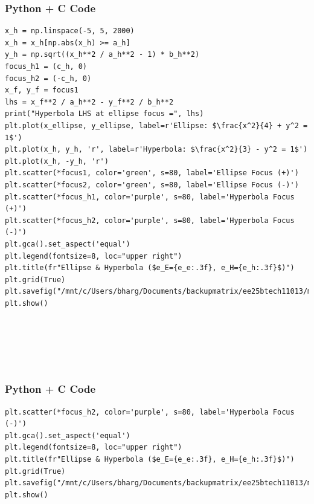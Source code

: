 \documentclass{beamer}
\begin{document}
\begin{frame}[fragile]
    \frametitle{Python + C Code}
    \begin{lstlisting}
x_h = np.linspace(-5, 5, 2000)
x_h = x_h[np.abs(x_h) >= a_h]
y_h = np.sqrt((x_h**2 / a_h**2 - 1) * b_h**2)
focus_h1 = (c_h, 0)
focus_h2 = (-c_h, 0)
x_f, y_f = focus1
lhs = x_f**2 / a_h**2 - y_f**2 / b_h**2
print("Hyperbola LHS at ellipse focus =", lhs)
plt.plot(x_ellipse, y_ellipse, label=r'Ellipse: $\frac{x^2}{4} + y^2 = 1$')
plt.plot(x_h, y_h, 'r', label=r'Hyperbola: $\frac{x^2}{3} - y^2 = 1$')
plt.plot(x_h, -y_h, 'r')
plt.scatter(*focus1, color='green', s=80, label='Ellipse Focus (+)')
plt.scatter(*focus2, color='green', s=80, label='Ellipse Focus (-)')
plt.scatter(*focus_h1, color='purple', s=80, label='Hyperbola Focus (+)')
plt.scatter(*focus_h2, color='purple', s=80, label='Hyperbola Focus (-)')
plt.gca().set_aspect('equal')
plt.legend(fontsize=8, loc="upper right")
plt.title(fr"Ellipse & Hyperbola ($e_E={e_e:.3f}, e_H={e_h:.3f}$)")
plt.grid(True)
plt.savefig("/mnt/c/Users/bharg/Documents/backupmatrix/ee25btech11013/matgeo/8.4.16/figs/Figure_1.png")
plt.show()






    \end{lstlisting}
\end{frame}
\begin{frame}[fragile]
    \frametitle{Python + C Code}
    \begin{lstlisting}
plt.scatter(*focus_h2, color='purple', s=80, label='Hyperbola Focus (-)')
plt.gca().set_aspect('equal')
plt.legend(fontsize=8, loc="upper right")
plt.title(fr"Ellipse & Hyperbola ($e_E={e_e:.3f}, e_H={e_h:.3f}$)")
plt.grid(True)
plt.savefig("/mnt/c/Users/bharg/Documents/backupmatrix/ee25btech11013/matgeo/8.4.16/figs/Figure_1.png")
plt.show()

    \end{lstlisting}
\end{frame}
\end{document}
